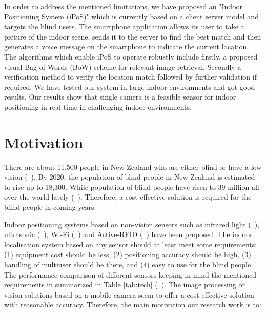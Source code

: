 In order to address the mentioned limitations,
we have proposed an "Indoor Positioning System (iPoS)" which is currently 
based on a client server model and targets the blind users. 
The smartphone application 
allows its user to take a picture of the indoor scene, sends 
it to the server to find the best match and then 
generates a voice message on the smartphone 
to indicate the current location. 
The algorithms which enable iPoS to operate robustly include 
firstly, a proposed visual Bag of Words (BoW) 
scheme for relevant image retrieval. 
Secondly a verification method to verify the location 
match followed by further validation if required.
We have tested our system
in large indoor environments and got good results. 
Our results show that single camera is 
a feasible sensor for indoor positioning 
in real time in challenging indoor environments.

\section{Motivation}
\label{sec:motivation}
There are about 11,500 people in New Zealand 
who are either blind or have a low vision (~\cite{rnzfb}).
By 2020, the population of blind people in New Zealand 
is estimated to rise up to 18,300. While population 
of blind people have risen to 39 million all over 
the world lately (~\cite{who12}).
Therefore, a cost effective solution 
is required for the blind people in coming years.

Indoor positioning systems based on non-vision 
sensors such as infrared light (~\cite{roy92}), 
ultrasonic (~\cite{ko08}), Wi-Fi (~\cite{paul08}) 
and Active-RFID (~\cite{ni04}) have been proposed. 
The indoor localisation system based on any sensor 
should at least meet some requirements: (1)
equipment cost should be less, 
(2) positioning accuracy should be high,  
(3) handling of multiuser should be there, 
and (4) easy to use for the blind people.
The performance comparison of different sensors 
keeping in mind the mentioned requirements 
in summarized in Table \ref{tab:tech} (~\cite{kawaji10}). 
The image processing or vision solutions based 
on a mobile camera seem to offer 
a cost effective solution with reasonable accuracy. 
Therefore, the main motivation our research work is to:

